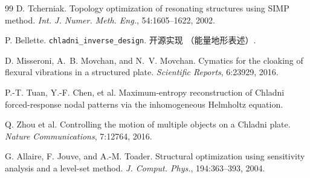 \documentclass[11pt,a4paper]{article}
\begin{document}
\begin{thebibliography}{99}
 D. Tcherniak. Topology optimization of resonating
structures using SIMP method. \textit{Int. J. Numer. Meth. Eng.}, 54:1605--1622,
2002.

 P. Bellette. \texttt{chladni\_inverse\_design}. 开源实现
（能量地形表述）.

 D. Misseroni, A.~B. Movchan, and N.~V. Movchan. Cymatics
for the cloaking of flexural vibrations in a structured plate. \textit{Scientific
Reports}, 6:23929, 2016.

 P.-T. Tuan, Y.-F. Chen, et al. Maximum-entropy reconstruction
of Chladni forced-response nodal patterns via the inhomogeneous Helmholtz
equation.

 Q. Zhou et al. Controlling the motion of multiple objects on a
Chladni plate. \textit{Nature Communications}, 7:12764, 2016.

 G. Allaire, F. Jouve, and A.-M. Toader. Structural
optimization using sensitivity analysis and a level-set method. \textit{J.
Comput. Phys.}, 194:363--393, 2004.

\end{thebibliography}
\end{document}
